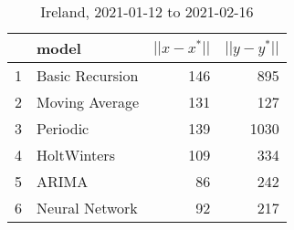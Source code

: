 \begin{table}[H]
\centering
\begin{tabular}{rlrr}
  \hline
 & model & $||x-x^*||$ & $||y-y^*||$ \\ 
  \hline
1 & Basic Recursion & 146 & 895 \\ 
  2 & Moving Average & 131 & 127 \\ 
  3 & Periodic & 139 & 1030 \\ 
  4 & HoltWinters & 109 & 334 \\ 
  5 & ARIMA &  86 & 242 \\ 
  6 & Neural Network &  92 & 217 \\ 
   \hline
\end{tabular}
\caption{Ireland, 2021-01-12 to 2021-02-16} 
\label{fig:Irelandsummarydf}
\end{table}
